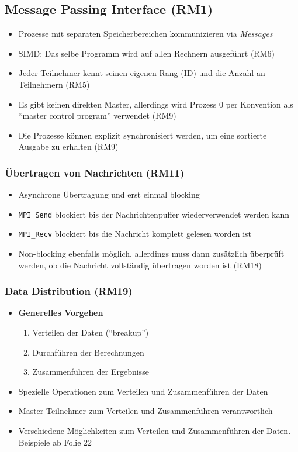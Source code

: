 \subsection{Message Passing Interface (RM1)}
\begin{itemize}
	\item Prozesse mit separaten Speicherbereichen kommunizieren via \textit{Messages}
	\item SIMD: Das selbe Programm wird auf allen Rechnern ausgeführt (RM6)
	\item Jeder Teilnehmer kennt seinen eigenen Rang (ID) und die Anzahl an Teilnehmern (RM5)
	\item Es gibt keinen direkten Master, allerdings wird Prozess 0 per Konvention als "`master control program"' verwendet (RM9)
	\item Die Prozesse können explizit synchronisiert werden, um eine sortierte Ausgabe zu erhalten (RM9)
\end{itemize}

\subsubsection{Übertragen von Nachrichten (RM11)}
\begin{itemize}
	\item Asynchrone Übertragung und erst einmal blocking
	\item \texttt{MPI_Send} blockiert bis der Nachrichtenpuffer wiederverwendet werden kann
	\item \texttt{MPI_Recv} blockiert bis die Nachricht komplett gelesen worden ist
	\item Non-blocking ebenfalls möglich, allerdings muss dann zusätzlich überprüft werden, ob die Nachricht vollständig übertragen worden ist (RM18)
\end{itemize}

\subsubsection{Data Distribution (RM19)}
\begin{itemize}
	\item \textbf{Generelles Vorgehen}
	\begin{enumerate}
		\item Verteilen der Daten ("`breakup"')
		\item Durchführen der Berechnungen
		\item Zusammenführen der Ergebnisse
	\end{enumerate}
	\item Spezielle Operationen zum Verteilen und Zusammenführen der Daten
	\item Master-Teilnehmer zum Verteilen und Zusammenführen verantwortlich
	\item Verschiedene Möglichkeiten zum Verteilen und Zusammenführen der Daten. Beispiele ab Folie 22
\end{itemize}


